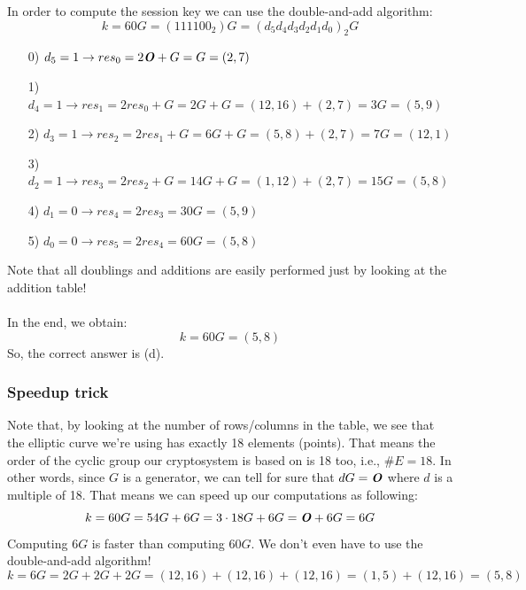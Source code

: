 \documentclass[11pt, a4paper]{article}
\begin{document}
\newpage
\hfill\break
In order to compute the session key we can use the double-and-add algorithm:
$$k=60G=(111100_2)G=(d_5d_4d_3d_2d_1d_0)_2G$$
\begin{enumerate}
    \item[0)] $d_5=1\rightarrow res_0=2\text{\textbf{\textit{O}}}+G=G=(2,7)$
    \item[1)] $d_4=1\rightarrow res_1=2res_0+G=2G+G=(12,16)+(2,7)=3G=(5,9)$
    \item[2)] $d_3=1\rightarrow res_2=2res_1+G=6G+G=(5,8)+(2,7)=7G=(12,1)$
    \item[3)] $d_2=1\rightarrow res_3=2res_2+G=14G+G=(1,12)+(2,7)=15G=(5,8)$
    \item[4)] $d_1=0\rightarrow res_4=2res_3=30G=(5,9)$
    \item[5)] $d_0=0\rightarrow res_5=2res_4=60G=(5,8)$
\end{enumerate}
Note that all doublings and additions are easily performed just by looking at the addition table!\\\\
In the end, we obtain: $$k=60G=(5,8)$$
So, the correct answer is (d).

\subsubsection*{Speedup trick}
Note that, by looking at the number of rows/columns in the table, we see that the elliptic curve we're using has exactly 18 elements (points). That means the order of the cyclic group our cryptosystem is based on is 18 too, i.e., $\#E=18$. In other words, since $G$ is a generator, we can tell for sure that $dG=\text{\textbf{\textit{O}}}$ where $d$ is a multiple of 18. That means we can speed up our computations as following:
$$k=60G=54G+6G=3\cdot18G+6G=\text{\textbf{\textit{O}}}+6G=6G$$
Computing $6G$ is faster than computing $60G$. We don't even have to use the double-and-add algorithm!
$$k=6G=2G+2G+2G=(12,16)+(12,16)+(12,16)=(1,5)+(12,16)=(5,8)$$

\newpage
\end{document}

